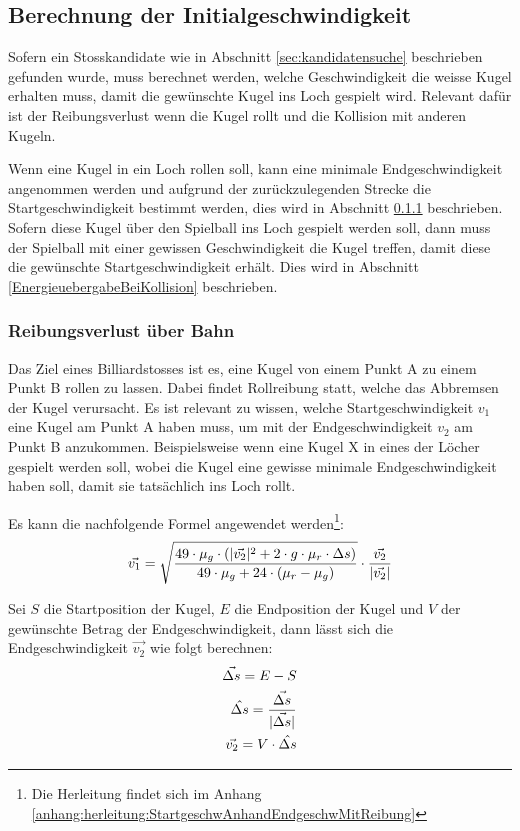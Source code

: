 \subsection{Berechnung der Initialgeschwindigkeit}\label{sec:initialgeschwindigkeit}
Sofern ein Stosskandidate wie in Abschnitt \ref{sec:kandidatensuche} beschrieben gefunden wurde, muss berechnet werden,
welche Geschwindigkeit die weisse Kugel erhalten muss, damit die gewünschte Kugel ins Loch gespielt wird.
Relevant dafür ist der Reibungsverlust wenn die Kugel rollt und die Kollision mit anderen Kugeln.

Wenn eine Kugel in ein Loch rollen soll, kann eine minimale Endgeschwindigkeit angenommen werden und aufgrund
der zurückzulegenden Strecke die Startgeschwindigkeit bestimmt werden, dies wird in Abschnitt \ref{ReibungsverlustUeberBahn} beschrieben.
Sofern diese Kugel über den Spielball ins Loch gespielt werden soll, dann muss der Spielball mit einer gewissen
Geschwindigkeit die Kugel treffen, damit diese die gewünschte Startgeschwindigkeit erhält. Dies wird in Abschnitt \ref{EnergieuebergabeBeiKollision} beschrieben.

\subsubsection{Reibungsverlust über Bahn}\label{ReibungsverlustUeberBahn}
Das Ziel eines Billiardstosses ist es, eine Kugel von einem Punkt A zu einem Punkt B rollen zu lassen.
Dabei findet Rollreibung statt, welche das Abbremsen der Kugel verursacht.
Es ist relevant zu wissen, welche Startgeschwindigkeit $v_1$ eine Kugel am Punkt A haben muss,
um mit der Endgeschwindigkeit $v_2$ am Punkt B anzukommen.
Beispielsweise wenn eine Kugel X in eines der Löcher gespielt werden soll,
wobei die Kugel eine gewisse minimale Endgeschwindigkeit haben soll, damit sie tatsächlich ins Loch rollt.

Es kann die nachfolgende Formel angewendet werden\footnote{Die Herleitung findet sich im Anhang \ref{anhang:herleitung:StartgeschwAnhandEndgeschwMitReibung}}:
\begin{align}
    \vec{v_1} = \sqrt{\frac{49 \cdot \mu_g \cdot (\lvert \vec{v_2} \rvert^2 + 2 \cdot g \cdot \mu_r \cdot \Delta s)}{49 \cdot \mu_g + 24 \cdot (\mu_r - \mu_g)}} \cdot \frac{\vec{v_2}}{\lvert \vec{v_2} \rvert}
\end{align}

Sei $S$ die Startposition der Kugel, $E$ die Endposition der Kugel und $V$ der gewünschte Betrag der Endgeschwindigkeit,
dann lässt sich die Endgeschwindigkeit $\vec{v_2}$ wie folgt berechnen:
\begin{align}
    \vec{\Delta s} = E - S\\
    \hat{\Delta s} = \frac{\vec{\Delta s}}{\lvert \vec{\Delta s} \rvert}\\
    \vec{v_2} = V \cdot \hat{\Delta s}
\end{align}

